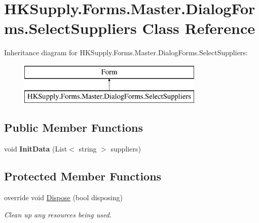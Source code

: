 \hypertarget{class_h_k_supply_1_1_forms_1_1_master_1_1_dialog_forms_1_1_select_suppliers}{}\section{H\+K\+Supply.\+Forms.\+Master.\+Dialog\+Forms.\+Select\+Suppliers Class Reference}
\label{class_h_k_supply_1_1_forms_1_1_master_1_1_dialog_forms_1_1_select_suppliers}
Inheritance diagram for H\+K\+Supply.\+Forms.\+Master.\+Dialog\+Forms.\+Select\+Suppliers\+:\begin{figure}[H]
\begin{center}
\leavevmode
\includegraphics[height=2.000000cm]{class_h_k_supply_1_1_forms_1_1_master_1_1_dialog_forms_1_1_select_suppliers}
\end{center}
\end{figure}
\subsection*{Public Member Functions}
\begin{DoxyCompactItemize}
\item 
\mbox{\label{class_h_k_supply_1_1_forms_1_1_master_1_1_dialog_forms_1_1_select_suppliers_a0d05cf33d5cf1ab7ebaa8061ab873e37}} 
void {\bfseries Init\+Data} (List$<$ string $>$ suppliers)
\end{DoxyCompactItemize}
\subsection*{Protected Member Functions}
\begin{DoxyCompactItemize}
\item 
override void \mbox{\hyperlink{class_h_k_supply_1_1_forms_1_1_master_1_1_dialog_forms_1_1_select_suppliers_a60ceecfaa31be0fd59019125bb62d133}{Dispose}} (bool disposing)
\begin{DoxyCompactList}\small\item\em Clean up any resources being used. \end{DoxyCompactList}\end{DoxyCompactItemize}
